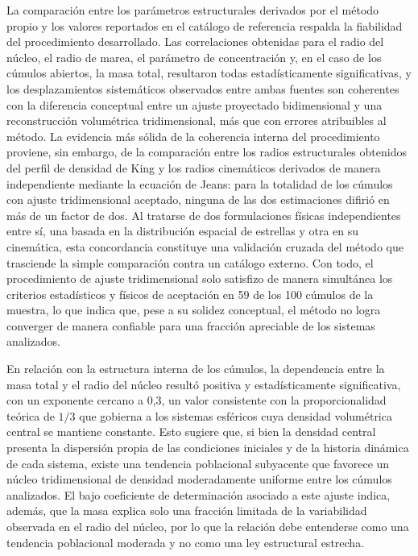     La comparación entre los parámetros estructurales derivados por el método 
    propio y los valores reportados en el catálogo de referencia respalda la 
    fiabilidad del procedimiento desarrollado. Las correlaciones obtenidas para 
    el radio del núcleo, el radio de marea, el parámetro de concentración y, en 
    el caso de los cúmulos abiertos, la masa total, resultaron todas 
    estadísticamente significativas, y los desplazamientos sistemáticos 
    observados entre ambas fuentes son coherentes con la diferencia conceptual 
    entre un ajuste proyectado bidimensional y una reconstrucción volumétrica 
    tridimensional, más que con errores atribuibles al método. La evidencia más 
    sólida de la coherencia interna del procedimiento proviene, sin embargo, de 
    la comparación entre los radios estructurales obtenidos del perfil de 
    densidad de King y los radios cinemáticos derivados de manera independiente 
    mediante la ecuación de Jeans: para la totalidad de los cúmulos con ajuste 
    tridimensional aceptado, ninguna de las dos estimaciones difirió en más de 
    un factor de dos. Al tratarse de dos formulaciones físicas independientes 
    entre sí, una basada en la distribución espacial de estrellas y otra en su 
    cinemática, esta concordancia constituye una validación cruzada del método 
    que trasciende la simple comparación contra un catálogo externo. Con todo, 
    el procedimiento de ajuste tridimensional solo satisfizo de manera 
    simultánea los criterios estadísticos y físicos de aceptación en 59 de los 
    100 cúmulos de la muestra, lo que indica que, pese a su solidez conceptual, 
    el método no logra converger de manera confiable para una fracción 
    apreciable de los sistemas analizados.

    En relación con la estructura interna de los cúmulos, la dependencia entre 
    la masa total y el radio del núcleo resultó positiva y estadísticamente 
    significativa, con un exponente cercano a 0,3, un valor consistente con la 
    proporcionalidad teórica de $1/3$ que gobierna a los sistemas esféricos cuya 
    densidad volumétrica central se mantiene constante. Esto sugiere que, si 
    bien la densidad central presenta la dispersión propia de las condiciones 
    iniciales y de la historia dinámica de cada sistema, existe una tendencia 
    poblacional subyacente que favorece un núcleo tridimensional de densidad 
    moderadamente uniforme entre los cúmulos analizados. El bajo coeficiente de 
    determinación asociado a este ajuste indica, además, que la masa explica 
    solo una fracción limitada de la variabilidad observada en el radio del 
    núcleo, por lo que la relación debe entenderse como una tendencia 
    poblacional moderada y no como una ley estructural estrecha.

